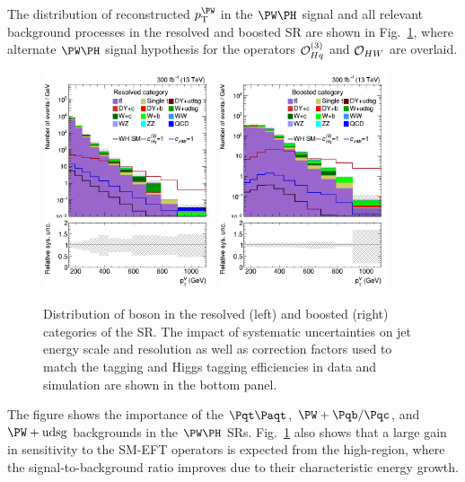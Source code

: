 \documentclass[a4paper,11pt]{article}
\newcommand{\Pb}{{{\Pqb}}\xspace}
\newcommand{\Pt}{{{\Pqt}}\xspace}
\newcommand{\Pc}{{{\Pqc}}\xspace}
\newcommand{\PAt}{{{{\Paqt}}}\xspace}
\begin{document}
The distribution of reconstructed $\pt^{\PW}$ in the $\PW\PH$ signal and all relevant background processes in the resolved and boosted SR are shown in Fig.~\ref{fig:RECO_Vpt_WH}, where alternate $\PW\PH$ signal hypothesis for the operators ${\cal O}^{(3)}_{Hq}$ and ${\cal O}_{HW}$  are overlaid. 
\begin{figure}[hbtp]
\begin{center}
\includegraphics[width=0.45\textwidth]{Figures/New/RECO/Plot_Resolved_SR_V_pt_WH.png}
\includegraphics[width=0.45\textwidth]{Figures/New/RECO/Plot_Boosted_SR_V_pt_WH.png}
\end{center}
\caption{
Distribution of \PW boson \pt in the resolved (left) and boosted (right) categories of the SR. The impact of systematic uncertainties on jet energy scale and resolution as well as correction factors used to match the \Pb tagging and Higgs tagging efficiencies in data and simulation are shown in the bottom panel.
}
\label{fig:RECO_Vpt_WH}
\end{figure}
The figure shows the importance of the $\Pt\PAt$, ${\PW}+\Pb/\Pc$, and ${\PW}+\textrm{udsg}$ backgrounds in the $\PW\PH$ SRs.
Fig.~\ref{fig:RECO_Vpt_WH} also shows that a large gain in sensitivity to the SM-EFT operators is expected from the high-\pt region, where the signal-to-background ratio improves due to their characteristic energy growth.
\end{document}
